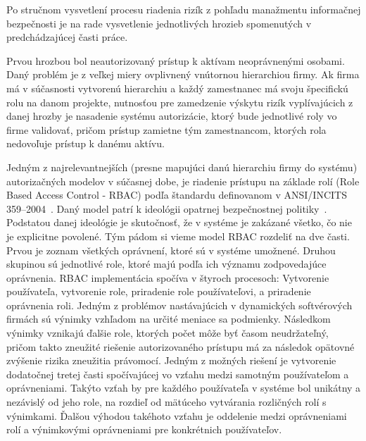 \par Po stručnom vysvetlení procesu riadenia rizík z pohľadu manažmentu informačnej bezpečnosti je na rade vysvetlenie
jednotlivých hrozieb spomenutých v predchádzajúcej časti práce.

\par Prvou hrozbou bol neautorizovaný prístup k aktívam neoprávnenými
osobami. Daný problém je z veľkej miery ovplivnený vnútornou hierarchiou firmy. Ak firma má v súčasnosti vytvorenú hierarchiu
a každý zamestnanec má svoju špecifickú rolu na danom projekte, nutnosťou pre zamedzenie výskytu rizík vyplívajúcich z
danej hrozby je nasadenie systému autorizácie, ktorý bude jednotlivé roly vo firme validovať, pričom prístup zamietne
tým zamestnancom, ktorých rola nedovoľuje prístup k danému aktívu.

\par Jedným z najrelevantnejších (presne mapujúci danú hierarchiu firmy do systému) autorizačných modelov v súčasnej dobe, je riadenie prístupu na základe rolí (Role Based
Access Control - RBAC) podľa štandardu definovanom v ANSI/INCITS 359–2004~\cite{RBAC}. Daný model patrí k ideológii opatrnej
bezpečnostnej politiky~\cite{OpatrnaBezpecnostnaPolitika}. Podstatou danej ideológie je skutočnosť, že v systéme je zakázané
všetko, čo nie je explicitne povolené. Tým pádom si vieme model RBAC rozdeliť na dve časti. Prvou je zoznam všetkých oprávnení,
ktoré sú v systéme umožnené. Druhou skupinou sú jednotlivé role, ktoré majú podľa ich významu zodpovedajúce oprávnenia.
RBAC implementácia spočíva v štyroch procesoch: Vytvorenie používateľa, vytvorenie role, priradenie role používateľovi,
a priradenie oprávnenia roli. Jedným z problémov nastávajúcich v dynamických softvérových firmách sú výnimky vzhľadom
na určité meniace sa podmienky. Následkom výnimky vznikajú ďalšie role, ktorých počet môže byť časom neudržateľný,
pričom takto zneužité riešenie autorizovaného prístupu má za následok opätovné zvýšenie rizika zneužitia právomocí.
Jedným z možných riešení je vytvorenie dodatočnej tretej časti spočívajúcej vo vzťahu medzi samotným používateľom a
oprávneniami. Takýto vzťah by pre každého používateľa v systéme bol unikátny a nezávislý od jeho role, na rozdieľ od mätúceho
vytvárania rozličných rolí s výnimkami. Ďalšou výhodou takéhoto vzťahu je oddelenie medzi oprávneniami rolí a výnimkovými
oprávneniami pre konkrétnich používateľov.

